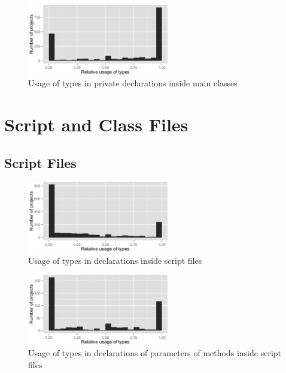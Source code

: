 \begin{figure}[h]
\centering 
\includegraphics[width=0.55\textwidth]{../aosd_2014/analysis/result/test/main/histograms/11_Private.png} 
\caption{Usage of types in private declarations inside main classes}
\end{figure}



\FloatBarrier

\section{Script and Class Files\label{a:script}}

\subsection*{Script Files}

\begin{figure}[h]
\centering 
\includegraphics[width=0.55\textwidth]{../aosd_2014/analysis/result/script/script/histograms/5_all_types.png} 
\caption{Usage of types in declarations inside script files}
\end{figure}

\begin{figure}[h]
\centering 
\includegraphics[width=0.55\textwidth]{../aosd_2014/analysis/result/script/script/histograms/8_Method_Parameter.png} 
\caption{Usage of types in declarations of parameters of methods inside script files}
\end{figure}

